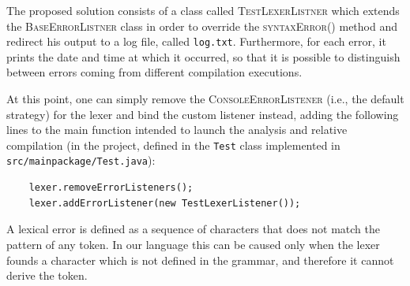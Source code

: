 \documentclass[11pt]{article} %
\begin{document}
\medskip

The proposed solution consists of a class called \textsc{TestLexerListner} which extends the \textsc{BaseErrorListner} class in order to override the \textsc{syntaxError()} method and redirect his output to a log file, called \verb|log.txt|. Furthermore, for each error, it prints the date and time at which it occurred, so that it is possible to distinguish between errors coming from different compilation executions. 

\medskip

At this point, one can simply remove the \textsc{ConsoleErrorListener} (i.e., the default strategy) for the lexer and bind the custom listener instead, adding the following lines to the main function intended to launch the analysis and relative compilation (in the project, defined in the \verb|Test| class implemented in \verb|src/mainpackage/Test.java|):
\begin{lstlisting}
    lexer.removeErrorListeners();
    lexer.addErrorListener(new TestLexerListener());
\end{lstlisting}

A lexical error is defined as a sequence of characters that does not match the pattern of any token. In our language this can be caused only when the lexer founds a character which is not defined in the grammar, and therefore it cannot derive the token. 

\clearpage
\end{document}

